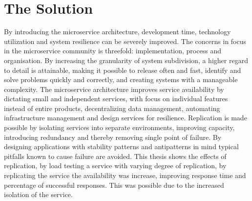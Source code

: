 

\section{The Solution}
By introducing the microservice architecture, development time, technology utilization and system resilience can be severely improved. The concerns in focus in the microservice community is threefold: implementation, process and organisation. By increasing the granularity of system subdivision, a higher regard to detail is attainable, making it possible to release often and fast, identify and solve problems quickly and correctly, and creating systems with a manageable complexity. The microservice architecture improves service availability by dictating small and independent services, with focus on individual features instead of entire products, decentralizing data management, automating infrastructure management and design services for resilience. Replication is made possible by isolating services into separate environments, improving capacity, introducing redundancy and thereby removing single point of failure. By designing applications with stability patterns and antipatterns in mind typical pitfalls known to cause failure are avoided. This thesis shows the effects of replication, by load testing a service with varying degree of replication, by replicating the service the availability was increase, improving response time and percentage of successful responses. This was possible due to the increased isolation of the service.

